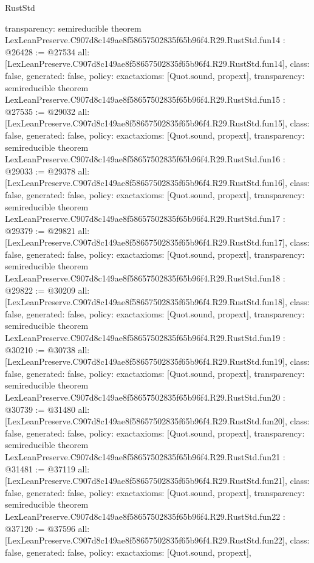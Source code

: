 \begin{lexlean}{RustStd}
\begin{coremodule}
{  transparency: semireducible
}
theorem LexLeanPreserve.C907d8c149ae8f58657502835f65b96f4.R29.RustStd.fun14 : @26428 := @27534 {
  all: [LexLeanPreserve.C907d8c149ae8f58657502835f65b96f4.R29.RustStd.fun14],
  class: false,
  generated: false,
  policy: exact{axioms: [Quot.sound, propext]},
  transparency: semireducible
}
theorem LexLeanPreserve.C907d8c149ae8f58657502835f65b96f4.R29.RustStd.fun15 : @27535 := @29032 {
  all: [LexLeanPreserve.C907d8c149ae8f58657502835f65b96f4.R29.RustStd.fun15],
  class: false,
  generated: false,
  policy: exact{axioms: [Quot.sound, propext]},
  transparency: semireducible
}
theorem LexLeanPreserve.C907d8c149ae8f58657502835f65b96f4.R29.RustStd.fun16 : @29033 := @29378 {
  all: [LexLeanPreserve.C907d8c149ae8f58657502835f65b96f4.R29.RustStd.fun16],
  class: false,
  generated: false,
  policy: exact{axioms: [Quot.sound, propext]},
  transparency: semireducible
}
theorem LexLeanPreserve.C907d8c149ae8f58657502835f65b96f4.R29.RustStd.fun17 : @29379 := @29821 {
  all: [LexLeanPreserve.C907d8c149ae8f58657502835f65b96f4.R29.RustStd.fun17],
  class: false,
  generated: false,
  policy: exact{axioms: [Quot.sound, propext]},
  transparency: semireducible
}
theorem LexLeanPreserve.C907d8c149ae8f58657502835f65b96f4.R29.RustStd.fun18 : @29822 := @30209 {
  all: [LexLeanPreserve.C907d8c149ae8f58657502835f65b96f4.R29.RustStd.fun18],
  class: false,
  generated: false,
  policy: exact{axioms: [Quot.sound, propext]},
  transparency: semireducible
}
theorem LexLeanPreserve.C907d8c149ae8f58657502835f65b96f4.R29.RustStd.fun19 : @30210 := @30738 {
  all: [LexLeanPreserve.C907d8c149ae8f58657502835f65b96f4.R29.RustStd.fun19],
  class: false,
  generated: false,
  policy: exact{axioms: [Quot.sound, propext]},
  transparency: semireducible
}
theorem LexLeanPreserve.C907d8c149ae8f58657502835f65b96f4.R29.RustStd.fun20 : @30739 := @31480 {
  all: [LexLeanPreserve.C907d8c149ae8f58657502835f65b96f4.R29.RustStd.fun20],
  class: false,
  generated: false,
  policy: exact{axioms: [Quot.sound, propext]},
  transparency: semireducible
}
theorem LexLeanPreserve.C907d8c149ae8f58657502835f65b96f4.R29.RustStd.fun21 : @31481 := @37119 {
  all: [LexLeanPreserve.C907d8c149ae8f58657502835f65b96f4.R29.RustStd.fun21],
  class: false,
  generated: false,
  policy: exact{axioms: [Quot.sound, propext]},
  transparency: semireducible
}
theorem LexLeanPreserve.C907d8c149ae8f58657502835f65b96f4.R29.RustStd.fun22 : @37120 := @37596 {
  all: [LexLeanPreserve.C907d8c149ae8f58657502835f65b96f4.R29.RustStd.fun22],
  class: false,
  generated: false,
  policy: exact{axioms: [Quot.sound, propext]},
}
\end{coremodule}
\end{lexlean}
